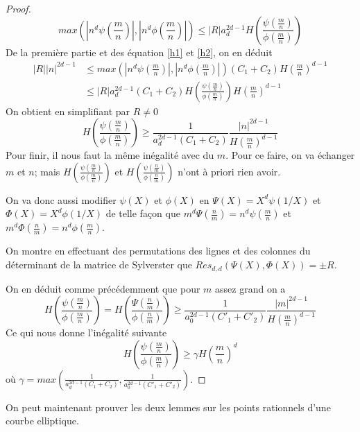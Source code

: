 \documentclass{article}
\begin{document}
\begin{proof}
\begin{equation}
\label{h2}
max(|n^d\psi(\frac{m}{n})|, |n^d\phi(\frac{m}{n})|) \leq |R|a_{d}^{2d-1} H(\frac{\psi(\frac{m}{n})}{\phi(\frac{m}{n})})
\end{equation}
De la première partie et des équation \ref{h1} et \ref{h2}, on en déduit
\begin{align*}
|R||n|^{2d-1} &\leq max(|n^d\psi(\frac{m}{n})|, |n^d\phi(\frac{m}{n})|)(C_{1} + C_{2})H(\frac{m}{n})^{d-1} \\
			&\leq |R|a_{d}^{2d-1}(C_{1} + C_{2})H(\frac{\psi(\frac{m}{n})}{\phi(\frac{m}{n})})H(\frac{m}{n})^{d-1}
\end{align*}
On obtient en simplifiant par $R \neq 0$
\begin{equation*}
H(\frac{\psi(\frac{m}{n})}{\phi(\frac{m}{n})}) \geq \frac{1}{a_{d}^{2d-1}(C_{1} + C_{2})}\frac{|n|^{2d-1}}{H(\frac{m}{n})^{d-1}}
\end{equation*}
Pour finir, il nous faut la même inégalité avec du $m$. Pour ce faire, on va échanger $m$ et $n$; mais
$H(\frac{\psi(\frac{m}{n})}{\phi(\frac{m}{n})})$ et $H(\frac{\psi(\frac{n}{m})}{\phi(\frac{n}{m})})$
n'ont à priori rien avoir.

On va donc aussi modifier $\psi(X)$ et $\phi(X)$ en $\Psi(X) = X^d\psi(1/X)$ et $\Phi(X) = X^d\phi(1/X)$
de telle façon que $m^d\Psi(\frac{n}{m}) = n^d\psi(\frac{m}{n})$ et $m^d\Phi(\frac{n}{m}) = n^d\phi(\frac{m}{n})$.

On montre en effectuant des permutations des lignes et des colonnes du déterminant de la matrice de Sylverster
que $Res_{d,d}(\Psi(X), \Phi(X)) = \pm R$.

On en déduit comme précédemment que pour $m$ assez grand on a
\begin{equation*}
H(\frac{\psi(\frac{m}{n})}{\phi(\frac{m}{n})}) = H(\frac{\Psi(\frac{n}{m})}{\phi(\frac{n}{m})})
 \geq \frac{1}{a_{0}^{2d-1}(C'_{1} + C'_{2})}\frac{|m|^{2d-1}}{H(\frac{m}{n})^{d-1}}
\end{equation*}
Ce qui nous donne l'inégalité suivante
\begin{equation*}
H(\frac{\psi(\frac{m}{n})}{\phi(\frac{m}{n})}) \geq \gamma H(\frac{m}{n})^{d}
\end{equation*}
où $\gamma = max(\frac{1}{a_{d}^{2d-1}(C_{1} + C_{2})}, \frac{1}{a_{0}^{2d-1}(C'_{1} + C'_{2})})$.
\end{proof}

On peut maintenant prouver les deux lemmes sur les points rationnels d'une courbe elliptique.
\end{document}

